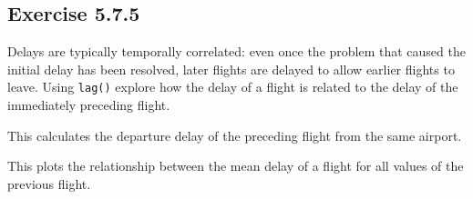 \documentclass[]{book}
\newenvironment{Shaded}{\begin{snugshade}}{\end{snugshade}}
\newcommand{\DataTypeTok}[1]{\textcolor[rgb]{0.13,0.29,0.53}{#1}}
\newcommand{\KeywordTok}[1]{\textcolor[rgb]{0.13,0.29,0.53}{\textbf{#1}}}
\newcommand{\NormalTok}[1]{#1}
\newcommand{\OperatorTok}[1]{\textcolor[rgb]{0.81,0.36,0.00}{\textbf{#1}}}
\newcommand{\StringTok}[1]{\textcolor[rgb]{0.31,0.60,0.02}{#1}}
\theoremstyle{plain}
\theoremstyle{remark}
\begin{document}
\hypertarget{exercise-5.7.5}{%
\subsection*{\texorpdfstring{Exercise
{5.7.5}}{Exercise 5.7.5}}\label{exercise-5.7.5}}

Delays are typically temporally correlated: even once the problem that
caused the initial delay has been resolved, later flights are delayed to
allow earlier flights to leave. Using \texttt{lag()} explore how the
delay of a flight is related to the delay of the immediately preceding
flight.

This calculates the departure delay of the preceding flight from the
same airport.

\begin{Shaded}
\end{Shaded}

This plots the relationship between the mean delay of a flight for all
values of the previous flight.

\begin{Shaded}
\end{Shaded}
\end{document}
